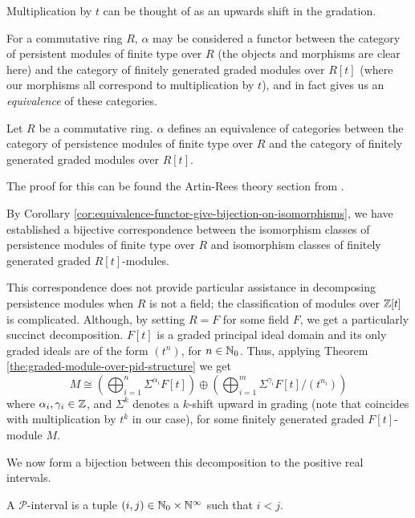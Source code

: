 Multiplication by $t$ can be thought of as an upwards shift in the gradation.

For a commutative ring $R$, $\alpha$ may be considered a functor between the category of persistent modules of finite type over $R$ (the objects and morphisms are clear here) and the category of finitely generated graded modules over $R[t]$ (where our morphisms all correspond to multiplication by $t$), and in fact gives us an \emph{equivalence} of these categories.

\begin{theorem} \label{the:zc-representation-theorem}
    Let $R$ be a commutative ring. $\alpha$ defines an equivalence of categories between the category of persistence modules of finite type over $R$ and the category of finitely generated graded modules over $R[t]$.
\end{theorem}

The proof for this can be found the Artin-Rees theory section from \textcite{Eisenbud1995}.

By Corollary \ref{cor:equivalence-functor-give-bijection-on-isomorphisms}, we have established a bijective correspondence between the isomorphism classes of persistence modules of finite type over $R$ and isomorphism classes of finitely generated graded $R[t]$-modules.

This correspondence does not provide particular assistance in decomposing persistence modules when $R$ is not a field; the classification of modules over $\mathbb Z[t]$ is complicated. Although, by setting $R = F$ for some field $F$, we get a particularly succinct decomposition. $F[t]$ is a graded principal ideal domain and its only graded ideals are of the form $(t^n)$, for $n \in \mathbb N_0$. Thus, applying Theorem \ref{the:graded-module-over-pid-structure} we get
\begin{equation} \label{eq:graded-polynomial-field-decomposition}
    M \cong
    \left(\bigoplus_{i=1}^n \Sigma^{\alpha_i} F[t] \right) \oplus
    \left(\bigoplus_{i=1}^m \Sigma^{\gamma_i} F[t]/(t^{n_i})\right)
\end{equation}
where $\alpha_i, \gamma_i \in \mathbb Z$, and $\Sigma^k$ denotes a $k$-shift upward in grading (note that coincides with multiplication by $t^k$ in our case), for some finitely generated graded $F[t]$-module $M$.

We now form a bijection between this decomposition to the positive real intervals. 

\begin{definition} \label{def:p-interval}
    A $\mathcal P$-interval is a tuple $(i,j) \in \mathbb N_0 \times \mathbb N^\infty$ such that $i < j$.
\end{definition}

